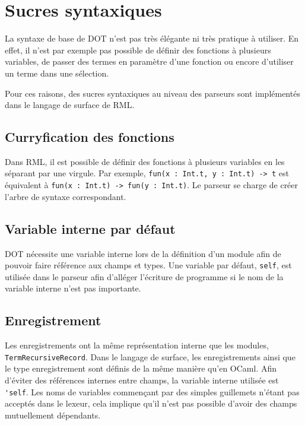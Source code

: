 \section{Sucres syntaxiques}

La syntaxe de base de DOT n'est pas très élégante ni très pratique à utiliser.
En effet, il n'est par exemple pas possible de définir des fonctions à plusieurs
variables, de passer des termes en paramètre d'une fonction ou encore d'utiliser
un terme dans une sélection.

Pour ces raisons, des sucres syntaxiques au niveau des parseurs sont implémentés
dans le langage de surface de RML.

\subsection*{Curryfication des fonctions}

Dans RML, il est possible de définir des fonctions à plusieurs variables en les
séparant par une virgule.
Par exemple, \verb|fun(x : Int.t, y : Int.t) -> t| est équivalent à
\verb|fun(x : Int.t) -> fun(y : Int.t)|. Le parseur se charge de créer l'arbre de
syntaxe correspondant.

\subsection*{Variable interne par défaut}

DOT nécessite une variable interne lors de la définition d'un module afin de
pouvoir faire référence aux champs et types. Une variable par défaut,
\verb|self|, est utilisée dans le parseur afin d'alléger l'écriture de programme
si le nom de la variable interne n'est pas importante.

\subsection*{Enregistrement}

Les enregistrements ont la même représentation interne que les modules,
\verb|TermRecursiveRecord|. Dans le langage de surface, les enregistrements
ainsi que le type enregistrement sont définis de la même manière qu'en OCaml.
Afin d'éviter des références internes entre champs, la variable interne utilisée
est \verb|'self|. Les noms de variables commençant par des simples guillemets
n'étant pas acceptés dans le lexeur, cela implique qu'il n'est pas possible
d'avoir des champs mutuellement dépendants.

